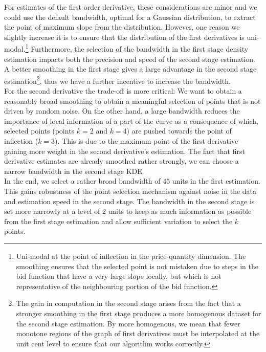 \begin{subappendices}
For estimates of the first order derivative, these considerations are minor and we could use the default bandwidth, optimal for a Gaussian distribution, to extract the point of maximum slope from the distribution. However, one reason we  slightly increase it is to ensure that the distribution of the first derivatives is uni-modal.\footnote{Uni-modal at the point of inflection in the price-quantity dimension. The smoothing ensures that the selected point is not mistaken due to steps in the bid function that have a very large slope locally, but which is not representative of the neighbouring portion of the bid function.} Furthermore, the selection of the bandwidth in the first stage density estimation impacts both the precision and speed of the second stage estimation. A better smoothing in the first stage gives a large advantage in the second stage estimation\footnote{The gain in computation in the second stage arises from the fact that a stronger smoothing in the first stage produces a more homogenous dataset for the second stage estimation. By more homogenous, we mean that fewer monotone  regions of the graph of first derivatives must be interpolated at the unit cent level to ensure that our algorithm works correctly.}, thus we have a further incentive to increase the bandwidth. \\

For the second derivative the trade-off is more critical: We want to obtain a reasonably broad smoothing to obtain a meaningful selection of points that is not driven by random noise. On the other hand, a large bandwidth reduces the importance of local information of a part of the curve as a consequence of which, selected points (points $k=2$ and $k=4$) are pushed towards the point of inflection ($k=3$). This is due to the maximum point of the first derivative gaining more weight in the second derivative's estimation. The fact that first derivative estimates are already smoothed rather strongly, we can choose a narrow bandwidth in the second stage KDE. \\

In the end, we select a rather broad bandwidth  of $45$ units in the first estimation. This gains robustness of the point selection mechanism against noise in the data and estimation speed in the second stage. The bandwidth in the second stage is set  more narrowly at a level of $2$ units to keep as much information as possible from the first stage estimation and allow sufficient variation to select the $k$ points. \\


\end{subappendices}
